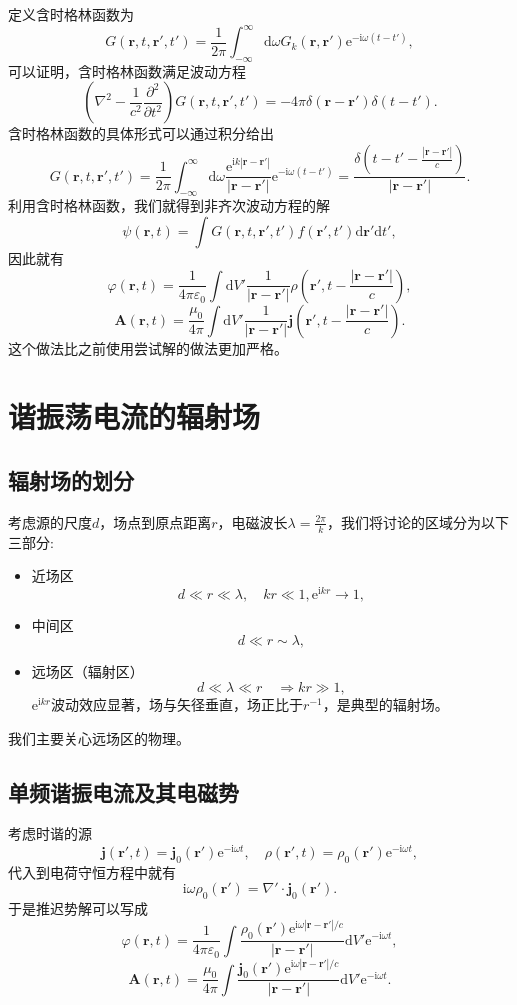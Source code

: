 \documentclass[UTF8]{ctexbook}
\newcommand{\e}{\mathrm{e}}
\renewcommand{\d}{\mathrm{d}}
\renewcommand{\b}{\boldsymbol}
\renewcommand{\i}{\mathrm{i}}
\renewcommand{\k}{\frac{1}{4\pi\varepsilon_0}}
\numberwithin{equation}{chapter}
\begin{document}
	定义含时格林函数为
	\[G(\b{r},t,\b{r}',t')=\frac{1}{2\pi}\int_{-\infty}^\infty \d \omega G_k(\b{r},\b{r}')\e^{-\i\omega(t-t')},\]
	可以证明，含时格林函数满足波动方程
	\[\left(\nabla^2-\frac{1}{c^2}\frac{\partial^2}{\partial t^2}\right)G(\b{r},t,\b{r}',t')=-4\pi\delta(\b{r}-\b{r}')\delta(t-t').\]
	含时格林函数的具体形式可以通过积分给出
	\[G(\b{r},t,\b{r}',t')=\frac{1}{2\pi}\int_{-\infty}^\infty \d \omega\frac{\e^{\i k|\b{r}-\b{r}'|}}{|\b{r}-\b{r}'|}\e^{-\i\omega(t-t')} = \frac{\delta\left(t-t'-\frac{|\b{r}-\b{r}'|}{c}\right)}{|\b{r}-\b{r}'|}.\]
	利用含时格林函数，我们就得到非齐次波动方程的解
	\[\psi(\b{r},t)=\int G(\b{r},t,\b{r}',t')f(\b{r}',t')\d\b{r}'\d t',\]
	因此就有
	\[\varphi(\b{r},t)=\k\int \d V' \frac{1}{|\b{r}-\b{r}'|}\rho\left(\b{r}',t-\frac{|\b{r}-\b{r}'|}{c}\right),\]	
	\[\b{A}(\b{r},t)=\frac{\mu_0}{4\pi}\int\d V'\frac{1}{|\b{r}-\b{r}'|}\b{j}\left(\b{r}',t-\frac{|\b{r}-\b{r}'|}{c}\right).\]
	这个做法比之前使用尝试解的做法更加严格。
	
	\section{谐振荡电流的辐射场}
	\subsection{辐射场的划分}
	考虑源的尺度$d$，场点到原点距离$r$，电磁波长$\lambda=\frac{2\pi}{k}$，我们将讨论的区域分为以下三部分:
	\begin{itemize}
		\item 近场区
		\[d\ll r\ll \lambda,\quad kr \ll 1 , \e^{\i k r}\rightarrow 1,\]
		\item 中间区
		\[d\ll r \sim \lambda,\]
		\item 远场区（辐射区）
		\[d\ll \lambda \ll r \quad \Rightarrow kr\gg 1,\]
		$\e^{\i k r}$波动效应显著，场与矢径垂直，场正比于$r^{-1}$，是典型的辐射场。
	\end{itemize}
	我们主要关心远场区的物理。
	
	\subsection{单频谐振电流及其电磁势}
	考虑时谐的源
	\[\b{j}(\b{r}',t)=\b{j}_0(\b{r}')\e^{-\i\omega t},\quad \rho(\b{r}',t)=\rho_0(\b{r}')\e^{-\i\omega t},\]
	代入到电荷守恒方程中就有
	\[\i\omega\rho_0(\b{r}')=\nabla'\cdot\b{j}_0(\b{r}').\]
	于是推迟势解可以写成
	\[\varphi(\b{r},t)=\k \int\frac{\rho_0(\b{r}')\e^{\i\omega|\b{r}-\b{r}'|/c}}{|\b{r}-\b{r}'|}\d V'\e^{-\i\omega t},\]
	\[\b{A}(\b{r},t)=\frac{\mu_0}{4\pi}\int\frac{\b{j}_0(\b{r}')\e^{\i\omega|\b{r}-\b{r}'|/c}}{|\b{r}-\b{r}'|}\d V'\e^{-\i\omega t}.\]
	
\end{document}

